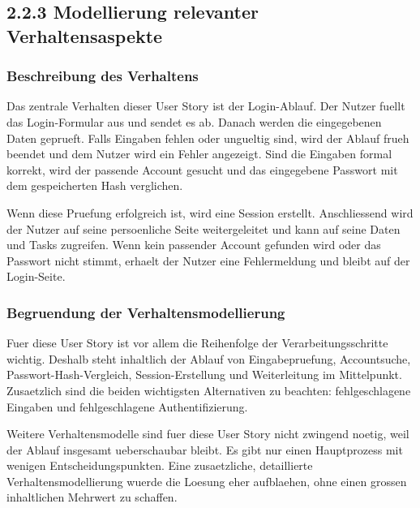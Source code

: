 \documentclass[a4paper,11pt]{article}
\begin{document}
\newpage

\subsection*{2.2.3 Modellierung relevanter Verhaltensaspekte}

\subsubsection*{Beschreibung des Verhaltens}

Das zentrale Verhalten dieser User Story ist der Login-Ablauf. Der Nutzer fuellt das Login-Formular aus und sendet es ab. Danach werden die eingegebenen Daten geprueft. Falls Eingaben fehlen oder ungueltig sind, wird der Ablauf frueh beendet und dem Nutzer wird ein Fehler angezeigt. Sind die Eingaben formal korrekt, wird der passende Account gesucht und das eingegebene Passwort mit dem gespeicherten Hash verglichen.

Wenn diese Pruefung erfolgreich ist, wird eine Session erstellt. Anschliessend wird der Nutzer auf seine persoenliche Seite weitergeleitet und kann auf seine Daten und Tasks zugreifen. Wenn kein passender Account gefunden wird oder das Passwort nicht stimmt, erhaelt der Nutzer eine Fehlermeldung und bleibt auf der Login-Seite.

\subsubsection*{Begruendung der Verhaltensmodellierung}

Fuer diese User Story ist vor allem die Reihenfolge der Verarbeitungsschritte wichtig. Deshalb steht inhaltlich der Ablauf von Eingabepruefung, Accountsuche, Passwort-Hash-Vergleich, Session-Erstellung und Weiterleitung im Mittelpunkt. Zusaetzlich sind die beiden wichtigsten Alternativen zu beachten: fehlgeschlagene Eingaben und fehlgeschlagene Authentifizierung.

Weitere Verhaltensmodelle sind fuer diese User Story nicht zwingend noetig, weil der Ablauf insgesamt ueberschaubar bleibt. Es gibt nur einen Hauptprozess mit wenigen Entscheidungspunkten. Eine zusaetzliche, detaillierte Verhaltensmodellierung wuerde die Loesung eher aufblaehen, ohne einen grossen inhaltlichen Mehrwert zu schaffen.
\end{document}
